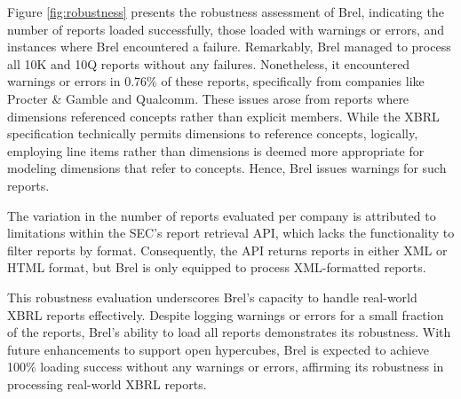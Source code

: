 

Figure \ref{fig:robustness} presents the robustness assessment of Brel, 
indicating the number of reports loaded successfully, those loaded with warnings or errors, 
and instances where Brel encountered a failure. 
Remarkably, Brel managed to process all 10K and 10Q reports without any failures. 
Nonetheless, it encountered warnings or errors in 0.76\% of these reports, 
specifically from companies like Procter \& Gamble and Qualcomm. 
These issues arose from reports where dimensions referenced concepts rather than explicit members. 
While the XBRL specification technically permits dimensions to reference concepts, logically, 
employing line items rather than dimensions is deemed more appropriate for modeling dimensions that refer to concepts. 
Hence, Brel issues warnings for such reports.

The variation in the number of reports evaluated per company is attributed to limitations within the SEC's report retrieval API, 
which lacks the functionality to filter reports by format. 
Consequently, the API returns reports in either XML or HTML format, but Brel is only equipped to process XML-formatted reports.

This robustness evaluation underscores Brel's capacity to handle real-world XBRL reports effectively. 
Despite logging warnings or errors for a small fraction of the reports, 
Brel's ability to load all reports demonstrates its robustness. 
With future enhancements to support open hypercubes, 
Brel is expected to achieve 100\% loading success without any warnings or errors, 
affirming its robustness in processing real-world XBRL reports.
